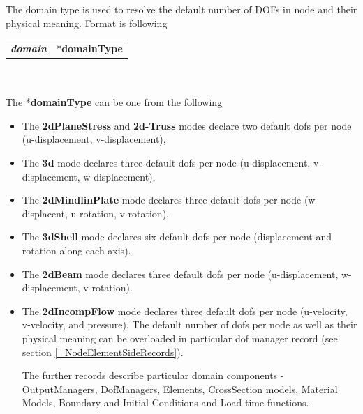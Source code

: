 \documentclass[a4paper]{article}
\makeatletter
\newcommand{\keywordnotype}[1]{\mbox{{\it{\bf{#1}}}}}
\newcommand{\entKeyword}[1]{\mbox{{*{\bf{#1}}}}}
\newcommand{\entKeywordInst}[1]{\mbox{{\bf{{#1}}}}}
\newenvironment{record}[1][]{\begin{tabular}{|ll}}{\end{tabular}\\}
\newcommand{\recentry}[2]{{#1}&{#2}\\}
\newcounter{rcc}
\newenvironment{record}[1][\textwidth]{\setcounter{rcc}{0}\begin{tabular*}{#1}{|ll@{\extracolsep{\fill}}r}}{\end{tabular*}\\}
\newcommand{\recentry}[2]{\ifthenelse{\value{rcc}>0}{&$\backslash$ \\}{\setcounter{rcc}{1}}{#1}&{#2}}
\makeatother
\begin{document}
The domain type is used to resolve the
default number of DOFs in node and their physical meaning. Format is following\\
\begin{record}
  \recentry{\keywordnotype{domain}}{\entKeyword{domainType}}
\end{record}\\
The \entKeyword{domainType} can be one from the following
\begin{itemize}
\item The \entKeywordInst{2dPlaneStress} and \entKeywordInst{2d-Truss}
modes declare two default dofs per node (u-displacement, v-displacement),
\item The \entKeywordInst{3d} mode declares three default dofs per
node (u-displacement, v-displacement, w-displacement),
\item The \entKeywordInst{2dMindlinPlate} mode declares three default
dofs per node (w-displacent, u-rotation, v-rotation).
\item The \entKeywordInst{3dShell} mode declares six default dofs
per node (displacement and rotation along each axis).
\item The \entKeywordInst{2dBeam} mode declares three default dofs per
node (u-displacement, w-displacement, v-rotation).
\item The \entKeywordInst{2dIncompFlow} mode declares three default
  dofs per node (u-velocity, v-velocity, and pressure).
The default number of dofs per node as well as their physical meaning
can be overloaded in particular dof manager record (see section
\ref{_NodeElementSideRecords}).

The further records describe particular domain components -
OutputManagers, DofManagers, Elements, CrossSection models, Material
Models, Boundary and Initial Conditions and Load time functions.

\end{itemize}
\end{document}
